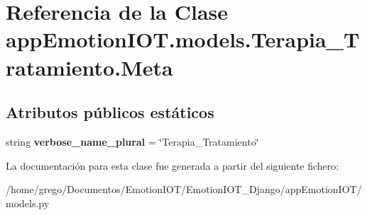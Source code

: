 \hypertarget{classappEmotionIOT_1_1models_1_1Terapia__Tratamiento_1_1Meta}{}\section{Referencia de la Clase app\+Emotion\+I\+O\+T.\+models.\+Terapia\+\_\+\+Tratamiento.\+Meta}
\label{classappEmotionIOT_1_1models_1_1Terapia__Tratamiento_1_1Meta}
\subsection*{Atributos públicos estáticos}
\begin{DoxyCompactItemize}
\item 
string {\bfseries verbose\+\_\+name\+\_\+plural} = \char`\"{}Terapia\+\_\+\+Tratamiento\char`\"{}\hypertarget{classappEmotionIOT_1_1models_1_1Terapia__Tratamiento_1_1Meta_aa0041cea7a2edb081cde8395872944b3}{}\label{classappEmotionIOT_1_1models_1_1Terapia__Tratamiento_1_1Meta_aa0041cea7a2edb081cde8395872944b3}

\end{DoxyCompactItemize}


La documentación para esta clase fue generada a partir del siguiente fichero\+:\begin{DoxyCompactItemize}
\item 
/home/grego/\+Documentos/\+Emotion\+I\+O\+T/\+Emotion\+I\+O\+T\+\_\+\+Django/app\+Emotion\+I\+O\+T/models.\+py\end{DoxyCompactItemize}
